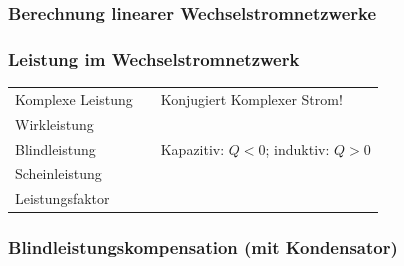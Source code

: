 		\subsubsection{Berechnung linearer Wechselstromnetzwerke}
		\subsubsection{Leistung im Wechselstromnetzwerk}%
				\begin{tabular}{p{7cm}p{4.5cm}p{7cm}}
					Komplexe Leistung &
						\fbox{$ \underline{S} = \underline{U} \cdot \underline{I}^\ast = U\cdot I \cdot e^{j(\varphi_u-\varphi_i)}$ }  &
						Konjugiert Komplexer Strom! \\
					Wirkleistung &
						\fbox{$ P = \Real(\underline{S}) = U I \cos(\varphi) $ } \\
					Blindleistung &
						\fbox{$ Q = \Imag(\underline{S}) = U I \sin(\varphi) $ } &
						Kapazitiv: $Q < 0$; induktiv: $Q > 0$ \\
					Scheinleistung &
						\fbox{$ S = | \underline{S} | = U I = \frac{U^2}{R} = I^2 R$ } \\
					Leistungsfaktor &
						\fbox{$\lambda = \frac{P}{S} = \frac{P}{UI} = \cos \varphi$} \\
				\end{tabular}
		\subsubsection{Blindleistungskompensation (mit Kondensator)}
		
		

